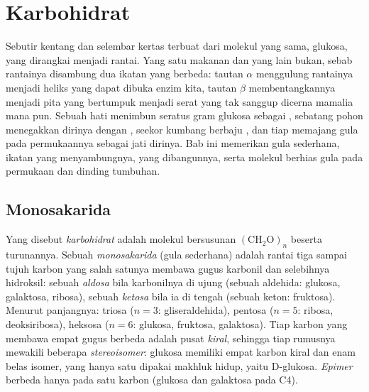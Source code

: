 \chapter{Karbohidrat}\label{ch:b1:carbohydrates}

Sebutir kentang dan selembar kertas terbuat dari molekul yang sama,
glukosa, yang dirangkai menjadi rantai. Yang satu makanan dan yang lain
bukan, sebab rantainya disambung dua ikatan yang berbeda: tautan
$\alpha$  menggulung rantainya menjadi heliks yang dapat dibuka
enzim kita, tautan $\beta$  membentangkannya menjadi pita yang
bertumpuk menjadi serat yang tak sanggup dicerna mamalia mana pun.
Sebuah hati menimbun seratus gram glukosa sebagai , sebatang
pohon menegakkan dirinya dengan , seekor kumbang berbaju ,
dan tiap  memajang gula pada permukaannya sebagai jati dirinya. Bab
ini memerikan gula sederhana, ikatan yang menyambungnya, 
yang dibangunnya, serta molekul berhias gula pada permukaan  dan
dinding tumbuhan.

\section{Monosakarida}

\begin{definition}[Monosakarida]\label{def:b1:carbohydrates:monosaccharide}
Yang disebut \emph{karbohidrat} adalah molekul
bersusunan $(\mathrm{CH_2O})_n$ beserta turunannya. Sebuah
\emph{monosakarida} (gula sederhana) adalah rantai
tiga sampai tujuh karbon yang salah satunya membawa gugus karbonil dan
selebihnya hidroksil: sebuah \emph{aldosa} bila
karbonilnya di ujung (sebuah aldehida: glukosa, galaktosa, ribosa),
sebuah \emph{ketosa} bila ia di tengah (sebuah keton:
fruktosa). Menurut panjangnya: triosa ($n = 3$: gliseraldehida),
pentosa ($n = 5$: ribosa, deoksiribosa), heksosa ($n = 6$: glukosa,
fruktosa, galaktosa). Tiap karbon yang membawa empat gugus berbeda
adalah pusat \emph{kiral}, sehingga tiap rumusnya mewakili beberapa
\emph{stereoisomer}: glukosa memiliki empat karbon kiral dan enam belas
isomer, yang hanya satu dipakai makhluk hidup, yaitu D-glukosa.
\emph{Epimer} berbeda hanya pada satu karbon (glukosa dan galaktosa
pada C4).
\end{definition}

